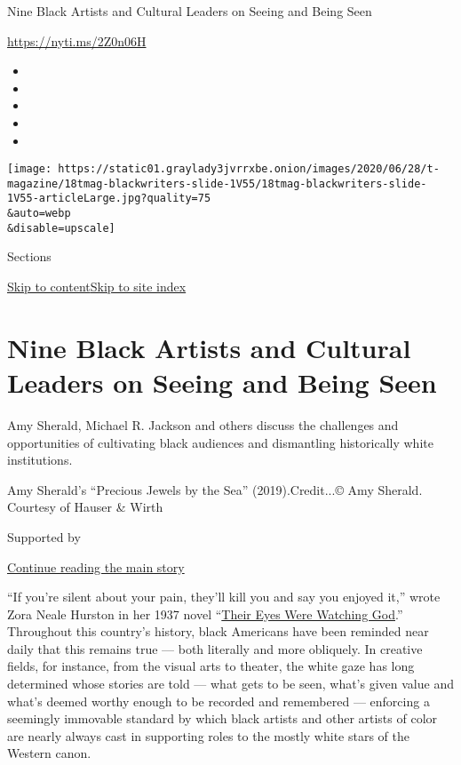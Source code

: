 Nine Black Artists and Cultural Leaders on Seeing and Being Seen

\url{https://nyti.ms/2Z0n06H}

\begin{itemize}
\item
\item
\item
\item
\item
\end{itemize}

\texttt{[image: https://static01.graylady3jvrrxbe.onion/images/2020/06/28/t-magazine/18tmag-blackwriters-slide-1V55/18tmag-blackwriters-slide-1V55-articleLarge.jpg?quality=75\\\&auto=webp\\\&disable=upscale]}

Sections

\protect\hyperlink{site-content}{Skip to
content}\protect\hyperlink{site-index}{Skip to site index}

\hypertarget{nine-black-artists-and-cultural-leaders-on-seeing-and-being-seen}{%
\section{Nine Black Artists and Cultural Leaders on Seeing and Being
Seen}\label{nine-black-artists-and-cultural-leaders-on-seeing-and-being-seen}}

Amy Sherald, Michael R. Jackson and others discuss the challenges and
opportunities of cultivating black audiences and dismantling
historically white institutions.

Amy Sherald's ``Precious Jewels by the Sea'' (2019).Credit...© Amy
Sherald. Courtesy of Hauser \& Wirth

Supported by

\protect\hyperlink{after-sponsor}{Continue reading the main story}

``If you're silent about your pain, they'll kill you and say you enjoyed
it,'' wrote Zora Neale Hurston in her 1937 novel
``\href{https://www.harpercollins.com/9780060838676/their-eyes-were-watching-god/}{Their
Eyes Were Watching God}.'' Throughout this country's history, black
Americans have been reminded near daily that this remains true --- both
literally and more obliquely. In creative fields, for instance, from the
visual arts to theater, the white gaze has long determined whose stories
are told --- what gets to be seen, what's given value and what's deemed
worthy enough to be recorded and remembered --- enforcing a seemingly
immovable standard by which black artists and other artists of color are
nearly always cast in supporting roles to the mostly white stars of the
Western canon.

